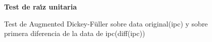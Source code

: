 \begin{figure}[H]
	\centering
	\textbf{Test de ra\'{\i}z unitaria}\par\medskip
	\caption{Test de Augmented Dickey-Füller sobre data original(ipc) y sobre primera diferencia de la data de ipc(diff(ipc))}\label{fig21}
\end{figure}

